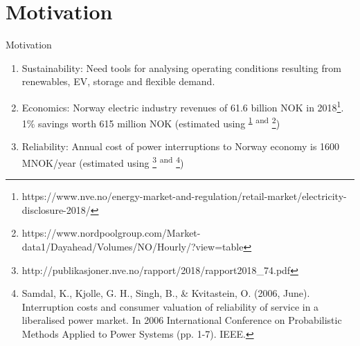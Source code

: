 \documentclass{beamer}
\begin{document}
\section{Motivation}	
\begin{frame}{Motivation}
		\begin{enumerate}
  			\item<1-> \vskip -1cm Sustainability: {\footnotesize Need tools for analysing operating conditions resulting from renewables, EV, storage and flexible demand.}
			\item<2-> Economics: {\footnotesize Norway electric industry revenues of 61.6 billion NOK in 2018\footnote{\label{note1} \tiny https://www.nve.no/energy-market-and-regulation/retail-market/electricity-disclosure-2018/}. 1\% savings worth 615 million NOK (estimated using \textsuperscript{\ref{note1}} \textsuperscript{and} \footnote{\tiny{https://www.nordpoolgroup.com/Market-data1/Dayahead/Volumes/NO/Hourly/?view=table}})} 

			\item<3-> Reliability: {\footnotesize Annual cost of power interruptions to Norway economy is 1600 MNOK/year (estimated using \footnote{\tiny http://publikasjoner.nve.no/rapport/2018/rapport2018\_74.pdf} \textsuperscript{and} \footnote{\tiny Samdal, K., Kjolle, G. H., Singh, B., \& Kvitastein, O. (2006, June). Interruption costs and consumer valuation of reliability of service in a liberalised power market. In 2006 International Conference on Probabilistic Methods Applied to Power Systems (pp. 1-7). IEEE.})   }
	\end{enumerate}
		\end{frame}	
\end{document}

